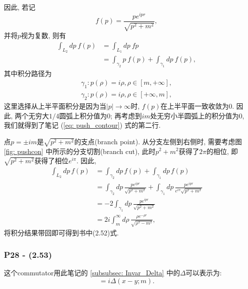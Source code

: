 \documentclass[cn,hazy,green,11pt,device=normal,chinesefont=founder]{elegantnote}
\begin{document}
因此, 若记
\begin{equation}
  f(p) = \frac{pe^{ipr}}{\sqrt{p^2+m^2}}, 
\end{equation}
并将$p$视为复数, 则有
\begin{equation}\label{eq: push_contour}
  \begin{aligned}
    \int_{L_2}dp\ f(p) &= \int_{L_1}dp\ fp \\
    &= \int_{\gamma_2}p\ f(p) + \int_{\gamma_1}dp\ f(p), 
  \end{aligned}
\end{equation}
其中积分路径为
\begin{equation*}
  \begin{aligned}
    \gamma_1: p(\rho) = i\rho, \rho\in[m,+\infty], \\
    \gamma_2: p(\rho) = i\rho, \rho\in[+\infty,m],  
  \end{aligned}
\end{equation*}
这里选择从上半平面积分是因为当$|p|\to\infty$时, $f(p)$在上半平面一致收敛为0. 因此, 两个无穷大$1/4$圆弧上积分值为0; 再考虑到$im$处无穷小半圆弧上的积分值为0, 我们就得到了笔记 (\ref{eq: push_contour}) 式的第二行. 

点$p = \pm im$是$\sqrt{p^2+m^2}$的支点(branch point). 从分支左侧到右侧时, 需要考虑图 \ref{fig: pushcon} 中所示的分支切割(branch cut), 此时$p^2+m^2$获得了$2\pi$的相位, 即$\sqrt{p^2+m^2}$获得了相位$e^{i\pi}$. 因此, 
\begin{equation}
  \begin{aligned}
    \int_{L_2}dp\,f(p) &= \int_{\gamma_2}dp\,f(p) + \int_{\gamma_1}dp\,f(p)\\
    &= \int_{\gamma_2}dp\,\frac{pe^{ipr}}{\sqrt{p^2+m^2}}
    + \int_{\gamma_1}dp\,\frac{pe^{ipr}}{e^{i\pi}\sqrt{p^2+m^2}}\\
    &= -2\int_{\gamma_1}dp\,\frac{pe^{ipr}}{\sqrt{p^2+m^2}}\\
    &= 2i\int_{m}^{\infty}d\rho\,\frac{\rho e^{-\rho r}}{\sqrt{\rho^2-m^2}}, 
  \end{aligned}
\end{equation}
将积分结果带回即可得到书中(2.52)式. 

\subsubsection{P28 - (2.53)}

这个commutator用此笔记的 \ref{subsubsec: Invar_Delta} 中的$\Delta$可以表示为: 
\begin{equation}
  [\phi(x), \phi(y)] = i\Delta(x-y; m). 
\end{equation}
\end{document}
